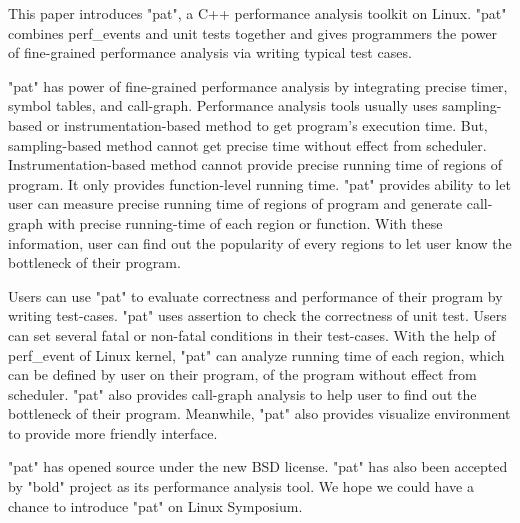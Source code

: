 This paper introduces "pat", a C++ performance analysis toolkit on Linux.
"pat" combines perf_events and unit tests together and gives programmers the power of fine-grained performance analysis via writing typical test cases.

"pat" has power of fine-grained performance analysis by integrating precise timer, symbol tables, and call-graph.
Performance analysis tools usually uses sampling-based or instrumentation-based method to get program's execution time.
But, sampling-based method cannot get precise time without effect from scheduler.
Instrumentation-based method cannot provide precise running time of regions of program. It only provides function-level running time. 
"pat" provides ability to let user can measure precise running time of regions of program and generate call-graph with precise running-time of each region or function. 
With these information, user can find out the popularity of every regions to let user know the bottleneck of their program.

Users can use "pat" to evaluate correctness and performance of their program by writing test-cases.
"pat" uses assertion to check the correctness of unit test. 
Users can set several fatal or non-fatal conditions in their test-cases.
With the help of perf_event of Linux kernel, "pat" can analyze running time of each region, which can be defined by user on their program, of the program without effect from scheduler. 
"pat" also provides call-graph analysis to help user to find out the bottleneck of their program. 
Meanwhile, "pat" also provides visualize environment to provide more friendly interface.

"pat" has opened source under the new BSD license. 
"pat" has also been accepted by "bold" project as its performance analysis tool.
We hope we could have a chance to introduce "pat" on Linux Symposium.
